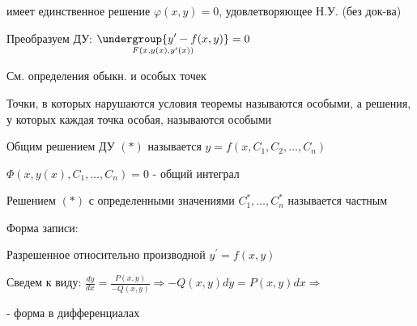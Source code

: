 \documentclass[12pt]{article}
\begin{document}
    имеет единственное решение $\varphi(x, y) = 0$, удовлетворяющее Н.У. (без док-ва)

    \Nota Преобразуем ДУ: $\displaystyle \underset{F(x, y(x), y^\prime(x))}{\undergroup{y^\prime - f(x, y)}} = 0$

    См. определения обыкн. и особых точек

     Точки, в которых нарушаются условия теоремы называются особыми, а решения, у которых каждая точка особая,
    называются особыми

     Общим решением ДУ $(*)$ называется $\displaystyle y = f(x, C_1, C_2, \dots, C_n)$

    \Nota $\displaystyle \Phi(x, y(x), C_1, \dots, C_n) = 0$ - общий интеграл

     Решением $(*)$ с определенными значениями $\displaystyle C_1^*, \dots, C_n^*$ называется частным

    \Nota Форма записи:

    Разрешенное относительно производной $\displaystyle y^\prime = f(x, y)$

    Сведем к виду: $\displaystyle \frac{dy}{dx} = \frac{P(x, y)}{-Q(x, y)} \Longrightarrow -Q(x, y)dy = P(x, y)dx \Longrightarrow $

     - форма в дифференциалах
\end{document}

